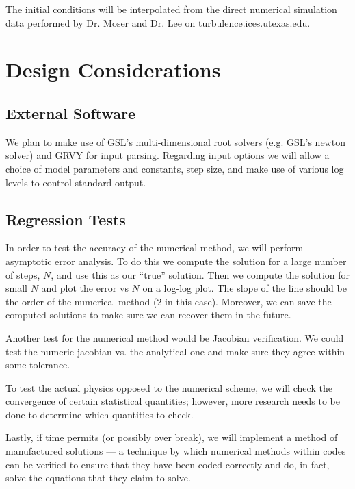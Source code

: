 \documentclass[12pt]{article}
\begin{document}
\noi The initial conditions will be interpolated from the direct numerical
simulation data performed by Dr. Moser and Dr. Lee on
turbulence.ices.utexas.edu. 

\section{Design Considerations}

\subsection{External Software}

We plan to make use of GSL's multi-dimensional root solvers (e.g. GSL's newton
solver) and GRVY for input parsing. Regarding input options we will allow a
choice of model parameters and constants, step size, and make use of various log
levels to control standard output.  

\subsection{Regression Tests}

In order to test the accuracy of the numerical method, we will perform
asymptotic error analysis. To do this we compute the solution for a large number
of steps, $N$, and use this as our ``true'' solution. Then we compute the
solution for small $N$ and plot the error vs $N$ on a log-log plot. The slope of
the line should be the order of the numerical method (2 in this case). Moreover, we
can save the computed solutions to make sure we can recover them in the future. 

Another test for the numerical method would be Jacobian verification. We
could test the numeric jacobian vs. the analytical one and make sure they agree
within some tolerance. 

To test the actual physics opposed to the numerical scheme, we will check the
convergence of certain statistical quantities; however, more research needs to be done
to determine which quantities to check. 

Lastly, if time permits (or possibly over break), we will implement a method of manufactured
solutions ---  a technique by which numerical methods within codes can be verified
to ensure that they have been coded correctly and do, in fact, solve the
equations that they claim to solve.
\end{document}
